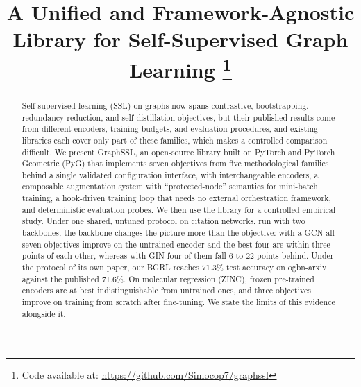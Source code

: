 \documentclass[conference]{IEEEtran}
\begin{document}
\title{A Unified and Framework-Agnostic Library for Self-Supervised Graph Learning
\thanks{Code available at: \url{https://github.com/Simocop7/graphssl}}
}

\author{
}

\maketitle

\begin{abstract}
Self-supervised learning (SSL) on graphs now spans contrastive, bootstrapping, redundancy-reduction, and self-distillation objectives, but their published results come from different encoders, training budgets, and evaluation procedures, and existing libraries each cover only part of these families, which makes a controlled comparison difficult. We present GraphSSL, an open-source library built on PyTorch and PyTorch Geometric (PyG) that implements seven objectives from five methodological families behind a single validated configuration interface, with interchangeable encoders, a composable augmentation system with ``protected-node'' semantics for mini-batch training, a hook-driven training loop that needs no external orchestration framework, and deterministic evaluation probes. We then use the library for a controlled empirical study. Under one shared, untuned protocol on citation networks, run with two backbones, the backbone changes the picture more than the objective: with a GCN all seven objectives improve on the untrained encoder and the best four are within three points of each other, whereas with GIN four of them fall 6 to 22 points behind. Under the protocol of its own paper, our BGRL reaches 71.3\% test accuracy on ogbn-arxiv against the published 71.6\%. On molecular regression (ZINC), frozen pre-trained encoders are at best indistinguishable from untrained ones, and three objectives improve on training from scratch after fine-tuning. We state the limits of this evidence alongside it.
\end{abstract}
\end{document}
